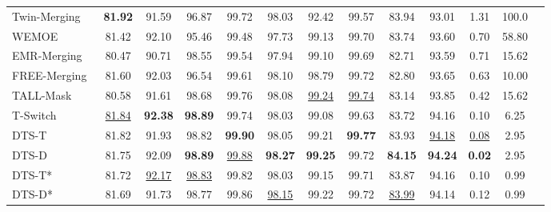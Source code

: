 \documentclass[11pt]{article}
\begin{document}
\begin{table}[htbp]
{\begin{tabular}{lcccccccccccc}
    \rowcolor{blue!10} 
    Twin-Merging~ &  \textbf{ 81.92 } & 91.59 & 96.87 & 99.72 & 98.03 & 92.42 & 99.57 & 83.94 & 93.01 & 1.31 & 100.0 \\ 
    \rowcolor{blue!10} 
    WEMOE~ &  81.42 & 92.10 & 95.46 & 99.48 & 97.73 & 99.13 & 99.70 & 83.74 & 93.60 & 0.70 & 58.80 \\ 
    \rowcolor{blue!10} 
    EMR-Merging~ &  80.47 & 90.71 & 98.55 & 99.54 & 97.94 & 99.10 & 99.69 & 82.71 & 93.59 & 0.71 & 15.62 \\ 
     \rowcolor{blue!10}
    FREE-Merging~  & 81.60 & 92.03 & 96.54 & 99.61 & 98.10 & 98.79 & 99.72 & 82.80 &  93.65 &  0.63 & 10.00  \\ 
    \rowcolor{blue!10} 
    TALL-Mask~ &  80.58 &	91.61 &	98.68 &	99.76 &	98.08 &	\underline{99.24} &	\underline{99.74} &	83.14 &	93.85 & 0.42 & 15.62 \\ 
    \rowcolor{blue!10} 
    T-Switch~ &  \underline{ 81.84 } & \textbf{ 92.38 } & \textbf{ 98.89 } & 99.74 & 98.03 & 99.08 & 99.63 & 83.72 & 94.16 & 0.10 & 6.25 \\
        \rowcolor{green!15} 
    DTS-T &  81.82 & 91.93 & 98.82 & \textbf{ 99.90 } & 98.05 & 99.21 & \textbf{ 99.77 } & 83.93 & \underline{ 94.18 } & \underline{0.08} & 2.95 \\ 
    \rowcolor{green!15} 
    DTS-D &  81.75 & 92.09 & \textbf{ 98.89 } & \underline{ 99.88 } & \textbf{ 98.27 } & \textbf{ 99.25 } & { 99.72 } & \textbf{ 84.15 } & \textbf{ 94.24 } & \textbf{0.02} & 2.95 \\ 
    \rowcolor{green!15} 
    DTS-T* &  81.72 & \underline{ 92.17 } & \underline{ 98.83 } & 99.82 & 98.03 & 99.15 & 99.71 & 83.87 & 94.16 & 0.10 & 0.99 \\ 
    \rowcolor{green!15} 
    DTS-D* &  81.69 & 91.73 & 98.77 & 99.86 & \underline{ 98.15 } & { 99.22 } & { 99.72 } & \underline{ 83.99 } & 94.14 & 0.12 & 0.99 \\ 
    \bottomrule
  \end{tabular}
}
\end{table}
\end{document}
